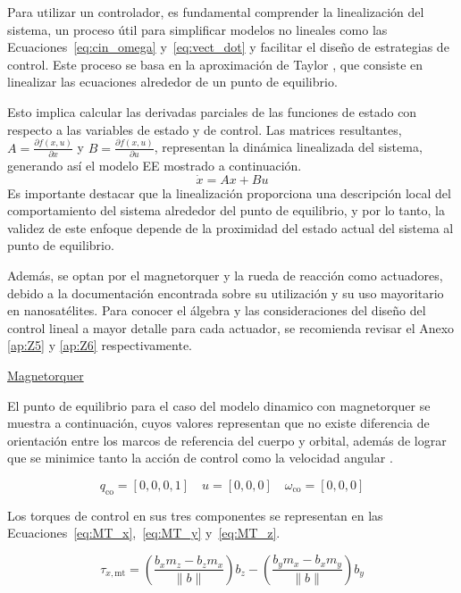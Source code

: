 Para utilizar un controlador, es fundamental comprender la linealización del sistema, un proceso útil para simplificar modelos no lineales como las Ecuaciones~\ref{eq:cin_omega} y~\ref{eq:vect_dot} y facilitar el diseño de estrategias de control. Este proceso se basa en la aproximación de Taylor \cite{ref42}, que consiste en linealizar las ecuaciones alrededor de un punto de equilibrio.

Esto implica calcular las derivadas parciales de las funciones de estado con respecto a las variables de estado y de control. Las matrices resultantes, $A = \frac{\partial f(x,u)}{\partial x}$ y $B = \frac{\partial f(x,u)}{\partial u}$, representan la dinámica linealizada del sistema, generando así el modelo \gls{EE} mostrado a continuación.
\[
	\dot{x} = A x + B u
\]
Es importante destacar que la linealización proporciona una descripción local del comportamiento del sistema alrededor del punto de equilibrio, y por lo tanto, la validez de este enfoque depende de la proximidad del estado actual del sistema al punto de equilibrio.

Además, se optan por el magnetorquer\cite{ref14} y la rueda de reacción\cite{ref41} como actuadores, debido a la documentación encontrada sobre su utilización y su uso mayoritario en nanosatélites. Para conocer el álgebra y las consideraciones del diseño del control lineal a mayor detalle para cada actuador, se recomienda revisar el Anexo \ref{ap:Z5} y \ref{ap:Z6} respectivamente. 

\underline{Magnetorquer}

El punto de equilibrio para el caso del modelo dinamico con magnetorquer se muestra a continuación, cuyos valores representan que no existe diferencia de orientación entre los marcos de referencia del cuerpo y orbital, además de lograr que se minimice tanto la acción de control como la velocidad angular \cite{ref14}.

\[
	q_{\text{co}} = [0, 0, 0, 1] \quad	u = [0, 0, 0] \quad	\omega_{\text{co}} = [0, 0, 0]
\]



Los torques de control en sus tres componentes se representan en las Ecuaciones~\ref{eq:MT_x},~\ref{eq:MT_y} y~\ref{eq:MT_z}.


\begin{equation}
	\tau_{x,\text{mt}} = \left( \frac{b_x m_z - b_z m_x}{\|b\|} \right) b_z - \left( \frac{b_y m_x - b_x m_y}{\|b\|} \right) b_y
	\label{eq:MT_x}
\end{equation}

